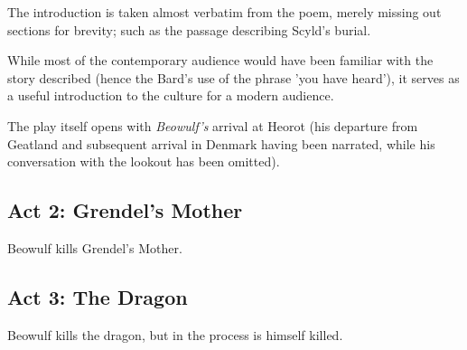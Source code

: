 \documentclass[a4paper]{article}
\begin{document}
The introduction is taken almost verbatim from the poem, merely missing out sections
for brevity; such as the passage describing Scyld's burial.

While most of the contemporary audience would have been familiar with the story
described (hence the Bard's use of the phrase 'you have heard'), it serves as
a useful introduction to the culture for a modern audience. 

The play itself opens with \textit{Beowulf's} arrival at Heorot (his departure
from Geatland and subsequent arrival in Denmark having been narrated, while his
conversation with the lookout has been omitted). 



\subsection{Act 2: Grendel's Mother}%

Beowulf kills Grendel's Mother.

\subsection{Act 3: The Dragon}%

Beowulf kills the dragon, but in the process is himself killed.
\end{document}

